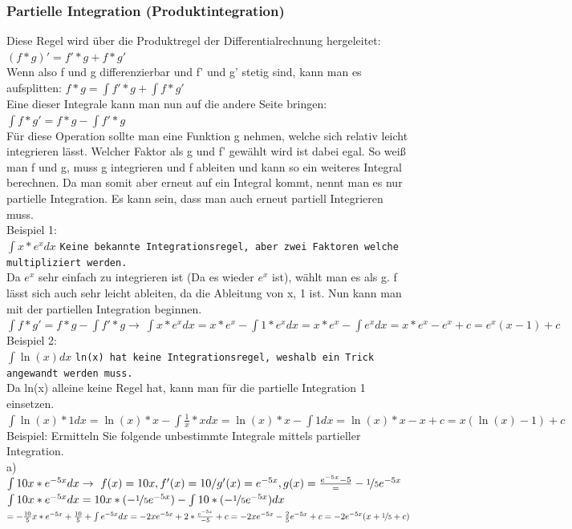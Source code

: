 \documentclass{article}
\begin{document}
	\subsubsection{Partielle Integration (Produktintegration)}
	Diese Regel wird über die Produktregel der Differentialrechnung hergeleitet: $(f*g)'=f'*g+f*g'$ \\
	Wenn also f und g differenzierbar und f' und g' stetig sind, kann man es aufsplitten: $f*g=\int f'*g+\int f*g'$ \\
	Eine dieser Integrale kann man nun auf die andere Seite bringen: $\int f*g'=f*g-\int f'*g$ \\
	Für diese Operation sollte man eine Funktion g nehmen, welche sich relativ leicht integrieren lässt. Welcher Faktor als g und f' gewählt wird ist dabei egal. So weiß man f und g, muss g integrieren und f ableiten und kann so ein weiteres Integral berechnen. Da man somit aber erneut auf ein Integral kommt, nennt man es nur partielle Integration. Es kann sein, dass man auch erneut partiell Integrieren muss. \\
	Beispiel 1: \\
	$\int x*e^xdx$ \verb|Keine bekannte Integrationsregel, aber zwei Faktoren welche multipliziert werden.| \\
	Da $e^x$ sehr einfach zu integrieren ist (Da es wieder $e^x$ ist), wählt man es als g. f lässt sich auch sehr leicht ableiten, da die Ableitung von x, 1 ist. Nun kann man mit der partiellen Integration beginnen. \\
	$\int f*g'=f*g-\int f'*g \to\ \int x*e^xdx=x*e^x-\int 1*e^xdx=x*e^x-\int e^xdx=x*e^x-e^x+c=e^x(x-1)+c$  \\
	Beispiel 2: \\
	$\int \ln(x)dx$ \verb|ln(x) hat keine Integrationsregel, weshalb ein Trick angewandt werden muss.| \\
	Da ln(x) alleine keine Regel hat, kann man für die partielle Integration 1 einsetzen. \\
	$\int \ln(x)*1dx=\ln(x)*x-\int\frac{1}{x}*xdx=\ln(x)*x-\int 1dx=\ln(x)*x-x+c=x(\ln(x)-1)+c$ \\
	Beispiel: Ermitteln Sie folgende unbestimmte Integrale mittels partieller Integration. \\
	a) $\int 10x*e^{-5x}dx\to\ f(x)=10x, f'(x)=10/g'(x)=e^{-5x}, g(x)=\frac{e^{-5x}{-5}}=-\nicefrac{1}{5}e^{-5x}$ \\
	$\int 10x*e^{-5x}dx=10x*(-\nicefrac{1}{5}e^{-5x})-\int 10*(-\nicefrac{1}{5}e^{-5x})dx$ \\
	$=-\frac{10}{5}x*e^{-5x}+\frac{10}{5}+\int e^{-5x}dx=-2xe^{-5x}+2*\frac{e^{-5x}}{-5}+c=-2xe^{-5x}-\frac{2}{5}e^{-5x}+c=-2e^{-5x}(x+\nicefrac{1}{5}+c)$
\end{document}
